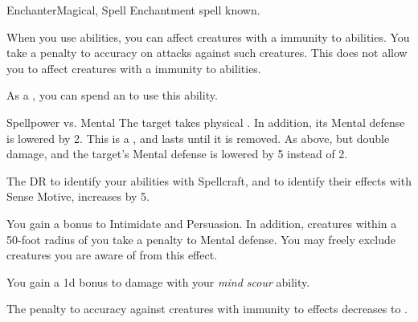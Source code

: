     \begin{feat}{Enchanter}{Magical, Spell}
        \featpre Enchantment spell known.
        \featben

         When you use  abilities, you can affect creatures with a  immunity to  abilities.
        You take a  penalty to accuracy on attacks against such creatures.
        This does not allow you to affect creatures with a  immunity to  abilities.

         As a , you can spend an  to use this ability.
        \begin{ability}
            \begin{spelltargetinginfo}
            \end{spelltargetinginfo}
            \begin{spelleffects}
                \begin{spellattack}{Spellpower vs. Mental} %
                    \spellsuccess The target takes physical .
                    In addition, its Mental defense is lowered by 2.
                    This is a , and lasts until it is removed.
                    \spellcritical As above, but double damage, and the target's Mental defense is lowered by 5 instead of 2.
                \end{spellattack}
            \end{spelleffects}
        \end{ability}

         The DR to identify your  abilities with Spellcraft, and to identify their effects with Sense Motive, increases by 5.

         You gain a  bonus to Intimidate and Persuasion.
        In addition, creatures within a 50-foot radius  of you take a  penalty to Mental defense.
        You may freely exclude creatures you are aware of from this effect.

         You gain a \plus1d bonus to damage with your \textit{mind scour} ability. 

         The penalty to accuracy against creatures with  immunity to  effects decreases to .


\end{feat}
